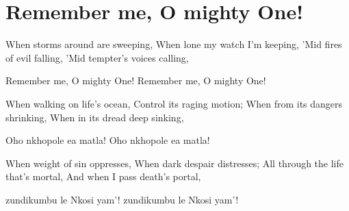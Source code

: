 \starttocol
\chapter{Remember me, O mighty One!}
\nexttocol
\hfill{\it }
\stoptocol
\starttocol
\startlines
{\sc When} storms around are sweeping,
When lone my watch I'm keeping,
'Mid fires of evil falling,
'Mid tempter's voices calling,

Remember me, O mighty One!
Remember me, O mighty One!

When walking on life's ocean,
Control its raging motion;
When from its dangers shrinking,
When in its dread deep sinking,

Oho nkhopole ea matla!
Oho nkhopole ea matla!

When weight of sin oppresses,
When dark despair distresses;
All through the life that's mortal,
And when I pass death's portal,

zundikumbu le Nkosi yam'!
zundikumbu le Nkosi yam'!

\stoplines
\nexttocol

\stoptocol
